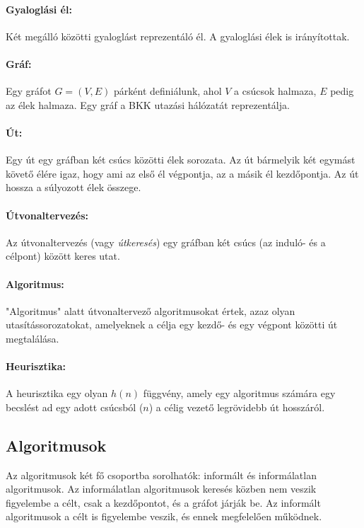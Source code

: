 \paragraph{Gyaloglási él:} Két megálló közötti gyaloglást reprezentáló él. A gyaloglási élek is irányítottak.

\paragraph{Gráf:} Egy gráfot $G = (V, E)$ párként definiálunk, ahol $V$ a csúcsok halmaza, $E$ pedig az élek halmaza. Egy gráf a BKK utazási hálózatát reprezentálja.

\paragraph{Út:} Egy út egy gráfban két csúcs közötti élek sorozata. Az út bármelyik két egymást követő élére igaz, hogy ami az első él végpontja, az a másik él kezdőpontja. Az út hossza a súlyozott élek összege.

\paragraph{Útvonaltervezés:} Az útvonaltervezés (vagy \textit{útkeresés}) egy gráfban két csúcs (az induló- és a célpont) között keres utat.

\paragraph{Algoritmus:} "Algoritmus" alatt útvonaltervező algoritmusokat értek, azaz olyan utasítássorozatokat, amelyeknek a célja egy kezdő- és egy végpont közötti út megtalálása.

\paragraph{Heurisztika:} A heurisztika egy olyan $h(n)$ függvény, amely egy algoritmus számára egy becslést ad egy adott csúcsból ($n$) a célig vezető legrövidebb út hosszáról\cite{russell2020artificial}.

\subsection{Algoritmusok}

Az algoritmusok két fő csoportba sorolhatók: informált és informálatlan algoritmusok\cite{russell2020artificial}. Az informálatlan algoritmusok keresés közben nem veszik figyelembe a célt, csak a kezdőpontot, és a gráfot járják be. Az informált algoritmusok a célt is figyelembe veszik, és ennek megfelelően működnek.

